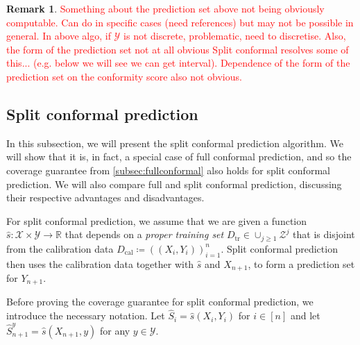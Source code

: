 \documentclass[11pt, titlepage]{article} %
\numberwithin{equation}{section}
\theoremstyle{definition}
\newtheorem{remark}{Remark}
\numberwithin{theorem}{section}
\numberwithin{lemma}{section}
\numberwithin{corollary}{section}
\numberwithin{proposition}{section}
\numberwithin{definition}{section}
\numberwithin{remark}{section}
\begin{document}
\begin{remark}
    \textcolor{red}{Something about the prediction set above not being obviously computable. Can do in specific cases (need references) but may not be possible in general. In above algo, if \(\mathcal{Y}\) is not discrete, problematic, need to discretise. Also, the form of the prediction set not at all obvious Split conformal resolves some of this... (e.g. below we will see we can get interval). Dependence of the form of the prediction set on the conformity score also not obvious.}
\end{remark}

\subsection{Split conformal prediction}
\label{subsec:splitconformal}

In this subsection, we will present the split conformal prediction algorithm. We will show that it is, in fact, a special case of full conformal prediction, and so the coverage guarantee from \cref{subsec:fullconformal} also holds for split conformal prediction. We will also compare full and split conformal prediction, discussing their respective advantages and disadvantages.\vskip5pt

\noindent
For split conformal prediction, we assume that we are given a function \(\hat{s}:\mathcal{X} \times \mathcal{Y} \to \mathbb{R}\) that depends on a \textit{proper training set} \(D_\mathrm{tr} \in \cup_{j \geq 1} \mathcal{Z}^j \) that is disjoint from the calibration data \(D_\mathrm{cal} \coloneqq ((X_i, Y_i))_{i=1}^n\).  Split conformal prediction then uses the calibration data together with \(\hat{s}\) and \(X_{n+1}\), to form a prediction set for \(Y_{n+1}\). \vskip5pt

\noindent
Before proving the coverage guarantee for split conformal prediction, we introduce the necessary notation. Let \(\hat{S}_i = \hat{s}(X_i, Y_i)\) for \(i \in [n]\) and let \(\hat{S}_{n+1}^y = \hat{s}(X_{n+1}, y)\) for any \(y \in \mathcal{Y}\).
\end{document}
